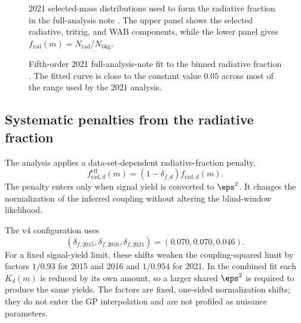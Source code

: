 \begin{figure}[H]
\centering
{}
\caption{2021 selected-mass distributions used to form the radiative fraction in the
full-analysis note \cite{HPS2021FullAnalysisNote}. The upper panel shows the selected
radiative, tritrig, and WAB components, while the lower panel gives
$f_{\mathrm{rad}}(m)=N_{\mathrm{rad}}/N_{\mathrm{bkg}}$.}
\label{fig:2021-radfrac-note-components}
\end{figure}

\begin{figure}[H]
\centering
{}
\caption{Fifth-order 2021 full-analysis-note fit to the binned radiative fraction
\cite{HPS2021FullAnalysisNote}. The fitted curve is close to the constant value
$0.05$ across most of the range used by the 2021 analysis.}
\label{fig:2021-radfrac-note-fit}
\end{figure}

\subsection{Systematic penalties from the radiative fraction}
\label{sec:radfrac-penalty}

The analysis applies a data-set-dependent radiative-fraction penalty,
\begin{equation}
f_{\mathrm{rad},d}^{\mathrm{eff}}(m)
= \left(1-\delta_{f,d}\right) f_{\mathrm{rad},d}(m).
\label{eq:frad-penalty}
\end{equation}
The penalty enters only when signal yield is converted to $\eps^2$. It changes the
normalization of the inferred coupling without altering the blind-window likelihood.

The v4 configuration uses
\begin{equation}
(\delta_{f,2015},\delta_{f,2016},\delta_{f,2021})=(0.070,0.070,0.046).
\label{eq:frad-penalty-vector}
\end{equation}
For a fixed signal-yield limit, these shifts weaken the coupling-squared limit by
factors $1/0.93$ for 2015 and 2016 and $1/0.954$ for 2021. In the combined fit each
$K_d(m)$ is reduced by its own amount, so a larger shared $\eps^2$ is required to
produce the same yields. The factors are fixed, one-sided normalization shifts; they
do not enter the GP interpolation and are not profiled as nuisance parameters.

